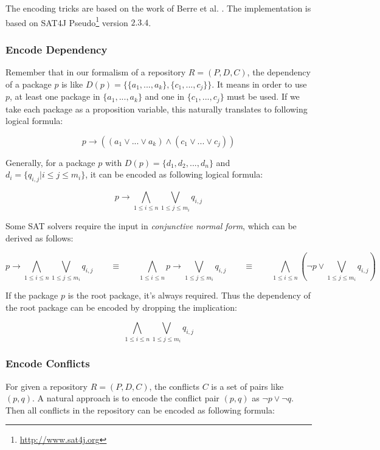 The encoding tricks are based on the work of Berre et al. \cite{berre2009dependency}. The implementation is based on SAT4J Pseudo\footnote{\url{http://www.sat4j.org}} version $2.3.4$.

\subsubsection{Encode Dependency}

Remember that in our formalism of a repository $R = (P, D, C)$, the dependency of a package $p$ is like $D(p) = \{\{a_1, ..., a_k\}, \{c_1, ..., c_j\}\}$. It means in order to use $p$, at least one package in $\{a_1, ..., a_k\}$ and one in $\{c_1, ..., c_j\}$ must be used. If we take each package as a proposition variable, this naturally translates to following logical formula:

\[
p \rightarrow ((a_1 \vee ... \vee a_k) \wedge (c_1 \vee ... \vee c_j))
\]

Generally, for a package $p$ with $D(p) = \{ d_1, d_2, ..., d_n\}$ and $d_i = \{ q_{i, j} | i \leq j \leq m_i \}$, it can be encoded as following logical formula:

\[
p \rightarrow \bigwedge_{1 \leq i \leq n} \bigvee_{1 \leq j \leq m_i} q_{i,j}
\]

Some SAT solvers require the input in \emph{conjunctive normal form}, which can be derived as follows:

\[
p \rightarrow \bigwedge_{1 \leq i \leq n} \bigvee_{1 \leq j \leq m_i} q_{i,j}
\quad \quad \equiv \quad \quad
\bigwedge_{1 \leq i \leq n} p \rightarrow \bigvee_{1 \leq j \leq m_i} q_{i,j}
\quad \quad \equiv \quad \quad
\bigwedge_{1 \leq i \leq n} (\neg p \vee \bigvee_{1 \leq j \leq m_i} q_{i,j})
\]

If the package $p$ is the root package, it's always required. Thus the dependency of the root package can be encoded by dropping the implication:

\[
\bigwedge_{1 \leq i \leq n} \bigvee_{1 \leq j \leq m_i} q_{i,j}
\]

\subsubsection{Encode Conflicts}

For given a repository $R = (P, D, C)$, the conflicts $C$ is a set of pairs like $(p, q)$. A natural approach is to encode the conflict pair $(p, q)$ as $\neg p \vee \neg q$. Then all conflicts in the repository can be encoded as following formula:

